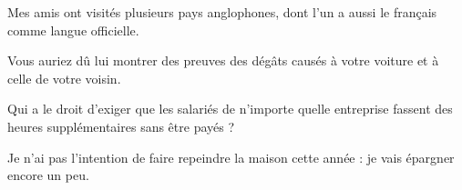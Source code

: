 \documentclass[a4paper,english,bookmarks]{article}
\begin{document}
\begin{enumerate}
\begin{minipage}[t]{0.45\linewidth}
        
        \item Mes amis ont visités plusieurs pays anglophones, dont l'un a aussi le français comme langue officielle.
        
        
        \item Vous auriez dû lui montrer des preuves des dégâts causés à votre voiture et à celle de votre voisin.
        
        
        \item Qui a le droit d'exiger que les salariés de n'importe quelle entreprise fassent des heures supplémentaires sans être payés ?
        
        
        \item Je n'ai pas l'intention de faire repeindre la maison cette année : je vais épargner encore un peu.
        
    \end{minipage}
\end{enumerate}
\end{document}
